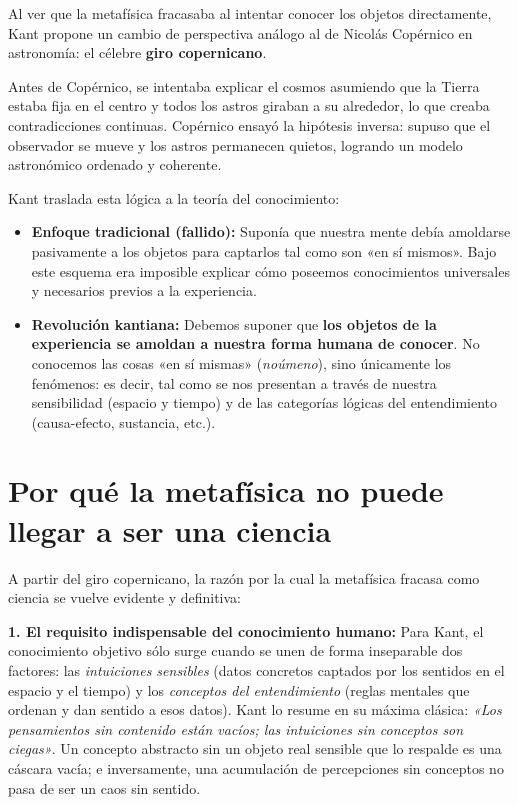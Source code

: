 \documentclass[a4paper, 11pt]{article}
\begin{document}
Al ver que la metafísica fracasaba al intentar conocer los objetos directamente, Kant propone un cambio de perspectiva análogo al de Nicolás Copérnico en astronomía: el célebre \textbf{giro copernicano}.

Antes de Copérnico, se intentaba explicar el cosmos asumiendo que la Tierra estaba fija en el centro y todos los astros giraban a su alrededor, lo que creaba contradicciones continuas. Copérnico ensayó la hipótesis inversa: supuso que el observador se mueve y los astros permanecen quietos, logrando un modelo astronómico ordenado y coherente.

Kant traslada esta lógica a la teoría del conocimiento:
\begin{itemize}
    \item \textbf{Enfoque tradicional (fallido):} Suponía que nuestra mente debía amoldarse pasivamente a los objetos para captarlos tal como son «en sí mismos». Bajo este esquema era imposible explicar cómo poseemos conocimientos universales y necesarios previos a la experiencia.
    \item \textbf{Revolución kantiana:} Debemos suponer que \textbf{los objetos de la experiencia se amoldan a nuestra forma humana de conocer}. No conocemos las cosas «en sí mismas» (\textit{noúmeno}), sino únicamente los fenómenos: es decir, tal como se nos presentan a través de nuestra sensibilidad (espacio y tiempo) y de las categorías lógicas del entendimiento (causa-efecto, sustancia, etc.).
\end{itemize}

\newpage


\section{Por qué la metafísica no puede llegar a ser una ciencia}

A partir del giro copernicano, la razón por la cual la metafísica fracasa como ciencia se vuelve evidente y definitiva:

\textbf{1. El requisito indispensable del conocimiento humano:} Para Kant, el conocimiento objetivo sólo surge cuando se unen de forma inseparable dos factores: las \textit{intuiciones sensibles} (datos concretos captados por los sentidos en el espacio y el tiempo) y los \textit{conceptos del entendimiento} (reglas mentales que ordenan y dan sentido a esos datos). Kant lo resume en su máxima clásica: \textit{«Los pensamientos sin contenido están vacíos; las intuiciones sin conceptos son ciegas»}. Un concepto abstracto sin un objeto real sensible que lo respalde es una cáscara vacía; e inversamente, una acumulación de percepciones sin conceptos no pasa de ser un caos sin sentido.
\end{document}
